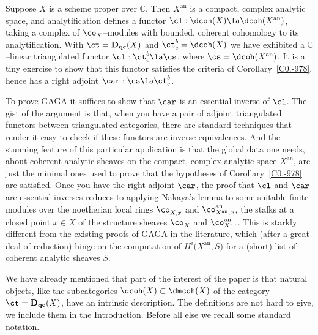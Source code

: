 \documentclass[11pt]{amsart}
\newcommand{\C}{{\mathbb C}}
\newcommand{\Dqc}{{\mathbf D_{\text{\bf qc}}}}
\begin{document}
Suppose $X$ is a scheme proper over $\C$. Then $X^{\text{an}}$ is a
compact, complex
analytic space, and analytification defines a functor
$\cl:\dcoh(X)\la\dcoh(X^{\text{an}})$, taking a complex of $\co_X^{}$--modules
with bounded, coherent cohomology to its analytification.
With $\ct=\Dqc(X)$ and $\ct^b_c=\dcoh(X)$ we have exhibited a
$\C$--linear triangulated
functor $\cl:\ct^b_c\la\cs$, where $\cs=\dcoh(X^{\text{an}})$. It is
a tiny exercise to show that this functor satisfies the criteria
of Corollary~\ref{C0.-978}, hence has a right adjoint $\car:\cs\la\ct^b_c$.

To prove GAGA it suffices to show that $\car$ is an essential inverse
of $\cl$. The
gist of the argument is that, when you have a pair of adjoint
triangulated functors between triangulated categories,
there are standard techniques that render it easy to
check if these functors are inverse equivalences. And the
stunning feature of this particular application is that the global
data one needs, about coherent analytic sheaves
on the compact, complex analytic space
$X^{\text{an}}$, are just the minimal ones used to prove that the
hypotheses of Corollary~\ref{C0.-978} are satisfied. Once
you have the right adjoint $\car$, the proof that
$\cl$ and $\car$ are essential inverses reduces to applying Nakaya's lemma
to some suitable finite modules over the noetherian local
rings $\co_{X,x}^{}$ and
$\co_{X^{\text{an}},x}^{\text{an}}$, the stalks at a closed point $x\in X$ of the
structure
sheaves $\co_X^{}$ and $\co_{X^{\text{an}}}^{\text{an}}$.
This is starkly different
from the existing proofs of GAGA in the literature,
which (after a great deal of reduction) hinge
on the computation of $H^i\big(X^{\text{an}},S\big)$ for a (short) list of
coherent analytic sheaves $S$. 
\ermk

We have already mentioned that
part of the interest of the paper is that natural objects,
like the subcategories 
$\dcoh(X)\subset\dmcoh(X)$
of the category $\ct=\Dqc(X)$,
have an intrinsic
description. The definitions are not hard to give, we
include them in the Introduction. Before all else we recall
some standard notation.
\end{document}
